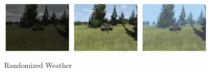 \begin{itemize}
\begin{itemize}
        \begin{figure}[H]
        \centering
        \subcaptionbox{}
          {\includegraphics[height=2.4cm, width=3.4cm]{images/vbs3/random-light/weather/weather-0.png}}
        \subcaptionbox{}%
          {\includegraphics[height=2.4cm, width=3.4cm]{images/vbs3/random-light/weather/weather-1.png}}
        \subcaptionbox{}%
          {\includegraphics[height=2.4cm, width=3.4cm]{images/vbs3/random-light/weather/weather-3.png}}
        \caption{Randomized Weather}
                \label{rand-weather}
        \end{figure}
             
    \end{itemize}

\end{itemize}


